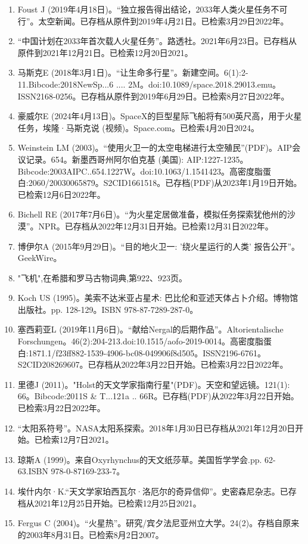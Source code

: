 \begin{enumerate}
\item Foust J (2019年4月18日)。“独立报告得出结论，2033年人类火星任务不可行”。太空新闻。已存档从原件到2019年4月21日。已检索3月29日2022年。
\item “中国计划在2033年首次载人火星任务”。路透社。2021年6月23日。已存档从原件到2021年12月21日。已检索12月20日2021。
\item 马斯克E (2018年3月1日)。“让生命多行星”。新建空间。6(1):2-11.Bibcode:2018NewSp...6 .... 2M。doi:10.1089/space.2018.29013.emu。ISSN2168-0256。已存档从原件到2019年6月29日。已检索8月27日2022年。 
\item 豪威尔E (2024年4月13日)。SpaceX的巨型星际飞船将有500英尺高，用于火星任务，埃隆·马斯克说 (视频)。Space.com。已检索4月20日2024。
\item Weinstein LM (2003)。“使用火卫一的太空电梯进行太空殖民”(PDF)。AIP会议记录。654。新墨西哥州阿尔伯克基 (美国): AIP:1227-1235。Bibcode:2003AIPC..654.1227W。doi:10.1063/1.1541423。高密度脂蛋白:2060/20030065879。S2CID1661518。已存档(PDF)从2023年1月19日开始。已检索12月6日2022年。  
\item Bichell RE (2017年7月6日)。“为火星定居做准备，模拟任务探索犹他州的沙漠”。NPR。已存档从2022年12月31日开始。已检索12月31日2022年。
\item 博伊尔A (2015年9月29日)。“目的地火卫一: '绕火星运行的人类' 报告公开”。GeekWire。
\item "飞机",在希腊和罗马古物词典,第922、923页。
\item Koch US (1995)。美索不达米亚占星术: 巴比伦和亚述天体占卜介绍。博物馆出版社。pp. 128-129。ISBN 978-87-7289-287-0。
\item 塞西莉亚L (2019年11月6日)。“献给Nergal的后期作品”。Altorientalische Forschungen。46(2):204-213.doi:10.1515/aofo-2019-0014。高密度脂蛋白:1871.1/f23ff882-1539-4906-bc08-049906f8d505。ISSN2196-6761。S2CID208269607。已存档从2022年3月22日开始。已检索3月22日2022年。  
\item 里德J (2011)。"Holst的天文学家指南行星"(PDF)。天空和望远镜。121(1): 66。Bibcode:2011S & T...121a .. 66R。已存档(PDF)从2022年3月22日开始。已检索3月22日2022年。
\item “太阳系符号”。NASA太阳系探索。2018年1月30日已存档从2021年12月20日开始。已检索12月7日2021。
\item 琼斯A (1999)。来自Oxyrhynchus的天文纸莎草。美国哲学学会.pp. 62-63.ISBN  978-0-87169-233-7。
\item 埃什内尔·K.“天文学家珀西瓦尔·洛厄尔的奇异信仰”。史密森尼杂志。已存档从2021年12月25日开始。已检索12月25日2021。
\item Fergus C (2004)。“火星热”。研究/宾夕法尼亚州立大学。24(2)。存档自原来的2003年8月31日。已检索8月2日2007。

\end{enumerate}
